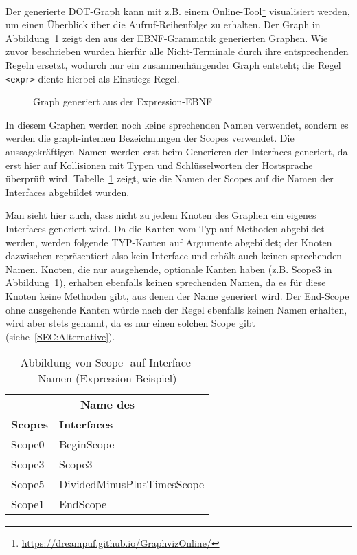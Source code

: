 \documentclass[../InterneDSLs.tex]{subfiles}
\begin{document}
Der generierte DOT-Graph kann mit z.B. einem Online-Tool\footnote{\url{https://dreampuf.github.io/GraphvizOnline/}} visualisiert werden, um einen Überblick über die Aufruf-Reihenfolge zu erhalten. Der Graph in Abbildung~\ref{FIG:ExprGraph} zeigt den aus der EBNF-Grammatik generierten Graphen. Wie zuvor beschrieben wurden hierfür alle Nicht-Terminale durch ihre entsprechenden Regeln ersetzt, wodurch nur ein zusammenhängender Graph entsteht; die Regel \verb|<expr>| diente hierbei als Einstiegs-Regel.

\begin{figure}[ht]
\centering
\resizebox{\linewidth}{!}{}
\caption{Graph generiert aus der Expression-EBNF}
\label{FIG:ExprGraph}
\end{figure}

In diesem Graphen werden noch keine sprechenden Namen verwendet, sondern es werden die graph-internen Bezeichnungen der Scopes verwendet. Die aussagekräftigen Namen werden erst beim Generieren der Interfaces generiert, da erst hier auf Kollisionen mit Typen und Schlüsselworten der Hostsprache überprüft wird. Tabelle~\ref{TAB:MappingExpressionScopeToInterface} zeigt, wie die Namen der Scopes auf die Namen der Interfaces abgebildet wurden.

Man sieht hier auch, dass nicht zu jedem Knoten des Graphen ein eigenes Interfaces generiert wird. Da die Kanten vom Typ  auf Methoden abgebildet werden, werden folgende TYP-Kanten auf Argumente abgebildet; der Knoten dazwischen repräsentiert also kein Interface und erhält auch keinen sprechenden Namen. Knoten, die nur ausgehende, optionale Kanten haben (z.B. Scope3 in Abbildung~\ref{FIG:ExprGraph}), erhalten ebenfalls keinen sprechenden Namen, da es für diese Knoten keine Methoden gibt, aus denen der Name generiert wird. Der End-Scope ohne ausgehende Kanten würde nach der Regel ebenfalls keinen Namen erhalten, wird aber stets  genannt, da es nur einen solchen Scope gibt (siehe~\ref{SEC:Alternative}).

\begin{table}[ht]
\centering
\begin{tabular}{ll}
\multicolumn{2}{c}{\textbf{Name des}}\\
\textbf{Scopes} & \textbf{Interfaces}\\\hline
Scope0 & BeginScope\\
Scope3 & Scope3\\
Scope5 & DividedMinusPlusTimesScope\\
Scope1 & EndScope\\
\end{tabular}
\caption[Abbildung von Scope- auf Interfacenamen (Expression-Beispiel)]{Abbildung von Scope- auf Interface-Namen (Expression-Beispiel)}
\label{TAB:MappingExpressionScopeToInterface}
\end{table}
\end{document}
